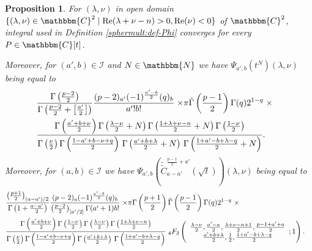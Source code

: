 \documentclass{article}
\newcommand{\tmop}[1]{\ensuremath{\operatorname{#1}}}
\newtheorem{proposition}{Proposition}[section]
\theoremstyle{remark}
\begin{document}
\begin{proposition}
  \label{sphermult:prop-criterion-corollaries}For $(\lambda, \nu)$ in open
  domain $\{ (\lambda, \nu) \in \mathbbm{C}^2 \mid \tmop{Re} (\lambda + \nu -
  n) > 0, \tmop{Re} (\nu) < 0 \}$ of $\mathbbm{C}^2$, integral used in
  Definition \ref{sphermult:def-Phi} converges for every $P \in \mathbbm{C}
  [t]$.
  
  Moreover, for $(a', b) \in \mathcal{I}$ and $N \in \mathbbm{N}$ we have
  $\Psi_{a', b} (t^N) (\lambda, \nu)$ being equal to
  \begin{eqnarray}
    & \frac{\Gamma \left( \frac{p - 2}{2} \right)}{\Gamma \left( \frac{p -
    2}{2} + \left[ \frac{a'}{2} \right] \right)} \frac{(p - 2)_{a'} (-
    1)^{\frac{a' - b}{2}} (q)_b}{a' ! b!} \left. \times \pi \tilde{\Gamma}
    \left( \frac{p - 1}{2} \right) \Gamma (q) 2^{1 - q} \right. \times & 
    \nonumber\\
    & \frac{\Gamma \left( \frac{a' + b + \nu}{2} \right) \Gamma \left(
    \frac{\lambda - \nu}{2} + N \right) \Gamma \left( \frac{1 + \lambda + \nu
    - n}{2} + N \right) \Gamma \left( \frac{1 - \nu}{2} \right)}{\Gamma \left(
    \frac{\nu}{2} \right) \Gamma \left( \frac{1 - a' + b - \nu + q}{2} \right)
    \hspace{0.17em} \Gamma \left( \frac{a' + b + \lambda}{2} + N \right) 
    \hspace{0.17em} \Gamma \left( \frac{1 + a' - b + \lambda - q}{2} + N
    \right)} . &  \nonumber
  \end{eqnarray}
  Moreover, for $(a, b) \in \mathcal{I}$ we have $\Psi_{a', b} \left(
  \widetilde{\tilde{C}}^{\frac{p - 1}{2} + a'}_{a - a'} \left( \sqrt{t}
  \right) \right) (\lambda, \nu)$ being equal to
  \begin{eqnarray}
    & \frac{\left( \frac{p + 1}{2} \right)_{(a - a') / 2}}{\Gamma \left( 1 +
    \frac{a - a'}{2} \right)}  \frac{(p - 2)_a (- 1)^{\frac{a' - b}{2}}
    (q)_b}{\left( \frac{p - 2}{2} \right)_{[a' / 2]} \Gamma (a' + 1) b!}
    \left. \times \pi \Gamma \left( \frac{p + 1}{2} \right) \tilde{\Gamma}
    \left( \frac{p - 1}{2} \right) \Gamma (q) 2^{1 - q} \right. \times & 
    \nonumber\\
    & \frac{\Gamma \left( \frac{a' + b + \nu}{2} \right) \Gamma \left(
    \frac{1 - \nu}{2} \right) \Gamma \left( \frac{\lambda - \nu}{2} \right)
    \Gamma \left( \frac{1 + \lambda + \nu - n}{2} \right)}{\Gamma \left(
    \frac{\nu}{2} \right) \Gamma \left( \frac{1 - a' + b - \nu + q}{2} \right)
    \Gamma \left( \frac{a' + b + \lambda}{2} \right)  \hspace{0.17em} \Gamma
    \left( \frac{1 + a' - b + \lambda - q}{2} \right)} \;_4 F_3 \left(
    \begin{array}{c}
      \frac{\lambda - \nu}{2}, \frac{a' - a}{2}, \frac{\lambda + \nu - n +
      1}{2}, \frac{p - 1 + a' + a}{2}\\
      \frac{a' + b + \lambda}{2}, \frac{1}{2}, \frac{1 + a' - b + \lambda -
      q}{2}
    \end{array} ; 1 \right) . &  \nonumber
  \end{eqnarray}
\end{proposition}
\end{document}
